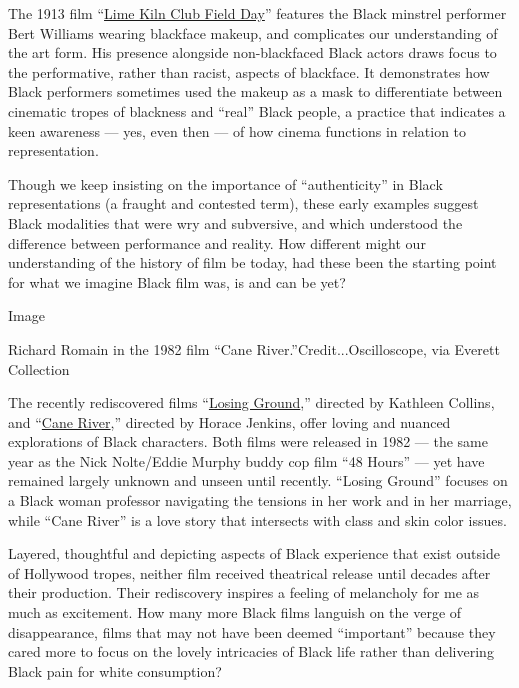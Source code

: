 The 1913 film
``\href{https://silentfilm.org/bert-williams-lime-kiln-club-field-day/}{Lime
Kiln Club Field Day}'' features the Black minstrel performer Bert
Williams wearing blackface makeup, and complicates our understanding of
the art form. His presence alongside non-blackfaced Black actors draws
focus to the performative, rather than racist, aspects of blackface. It
demonstrates how Black performers sometimes used the makeup as a mask to
differentiate between cinematic tropes of blackness and ``real'' Black
people, a practice that indicates a keen awareness --- yes, even then
--- of how cinema functions in relation to representation.

Though we keep insisting on the importance of ``authenticity'' in Black
representations (a fraught and contested term), these early examples
suggest Black modalities that were wry and subversive, and which
understood the difference between performance and reality. How different
might our understanding of the history of film be today, had these been
the starting point for what we imagine Black film was, is and can be
yet?

Image

Richard Romain in the 1982 film ``Cane River.''Credit...Oscilloscope,
via Everett Collection

The recently rediscovered films
``\href{https://www.nytimes.com/2016/04/17/movies/losing-ground-meditates-on-art-as-it-examines-a-marriage-in-peril.html}{Losing
Ground},'' directed by Kathleen Collins, and
``\href{https://www.nytimes.com/2020/02/06/movies/cane-river-review.html}{Cane
River},'' directed by Horace Jenkins, offer loving and nuanced
explorations of Black characters. Both films were released in 1982 ---
the same year as the Nick Nolte/Eddie Murphy buddy cop film ``48 Hours''
--- yet have remained largely unknown and unseen until recently.
``Losing Ground'' focuses on a Black woman professor navigating the
tensions in her work and in her marriage, while ``Cane River'' is a love
story that intersects with class and skin color issues.

Layered, thoughtful and depicting aspects of Black experience that exist
outside of Hollywood tropes, neither film received theatrical release
until decades after their production. Their rediscovery inspires a
feeling of melancholy for me as much as excitement. How many more Black
films languish on the verge of disappearance, films that may not have
been deemed ``important'' because they cared more to focus on the lovely
intricacies of Black life rather than delivering Black pain for white
consumption?

